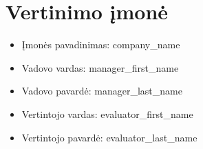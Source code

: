 \section{Vertinimo įmonė}
\begin{itemize}
    \item {Įmonės pavadinimas: {{ company_name }}}
    \item {Vadovo vardas: {{ manager_first_name }}}
    \item {Vadovo pavardė: {{ manager_last_name }}}
    \item {Vertintojo vardas: {{ evaluator_first_name }}}
    \item {Vertintojo pavardė: {{ evaluator_last_name }}}
\end{itemize}